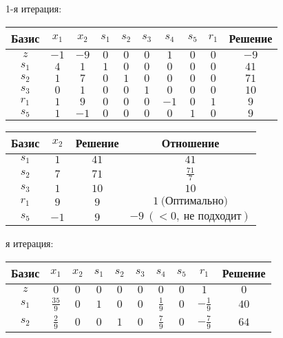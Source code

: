 \documentclass{article}%
\begin{document}
\begin{flushleft}%
1{-}я итерация: %
\newline%
\newline%
\renewcommand{\arraystretch}{1.3}%
\begin{tabular}{|c|cccccccc|c|}%
\hline%
Базис&$x_{1}$&$x_{2}$&$s_{1}$&$s_{2}$&$s_{3}$&$s_{4}$&$s_{5}$&$r_{1}$&Решение\\%
\hline%
$z$&$-1$&$-9$&$0$&$0$&$0$&$1$&$0$&$0$&$-9$\\%
\hline%
$s_{1}$&$4$&$1$&$1$&$0$&$0$&$0$&$0$&$0$&$41$\\%
$s_{2}$&$1$&$7$&$0$&$1$&$0$&$0$&$0$&$0$&$71$\\%
$s_{3}$&$0$&$1$&$0$&$0$&$1$&$0$&$0$&$0$&$10$\\%
$r_{1}$&$1$&$9$&$0$&$0$&$0$&$-1$&$0$&$1$&$9$\\%
$s_{5}$&$1$&$-1$&$0$&$0$&$0$&$0$&$1$&$0$&$9$\\%
\hline%
\end{tabular}%
\newline%
\newline%
\newline%
\begin{tabular}{|cccc|}%
\hline%
Базис&$x_{2}$&Решение&Отношение\\%
\hline%
$s_{1}$&$1$&$41$&$41$\\%
$s_{2}$&$7$&$71$&$\frac{71}{7}$\\%
$s_{3}$&$1$&$10$&$10$\\%
$r_{1}$&$9$&$9$&$1\: \text{(Оптимально)}$\\%
$s_{5}$&$-1$&$9$&$-9\: (< 0, \: \text{не подходит})$\\%
\hline%
\end{tabular}%
\newline%
\newline%
я итерация: %
\newline%
\newline%
\renewcommand{\arraystretch}{1.3}%
\begin{tabular}{|c|cccccccc|c|}%
\hline%
Базис&$x_{1}$&$x_{2}$&$s_{1}$&$s_{2}$&$s_{3}$&$s_{4}$&$s_{5}$&$r_{1}$&Решение\\%
\hline%
$z$&$0$&$0$&$0$&$0$&$0$&$0$&$0$&$1$&$0$\\%
\hline%
$s_{1}$&$\frac{35}{9}$&$0$&$1$&$0$&$0$&$\frac{1}{9}$&$0$&$-\frac{1}{9}$&$40$\\%
$s_{2}$&$\frac{2}{9}$&$0$&$0$&$1$&$0$&$\frac{7}{9}$&$0$&$-\frac{7}{9}$&$64$\\%

\end{tabular}
\end{flushleft}
\end{document}
